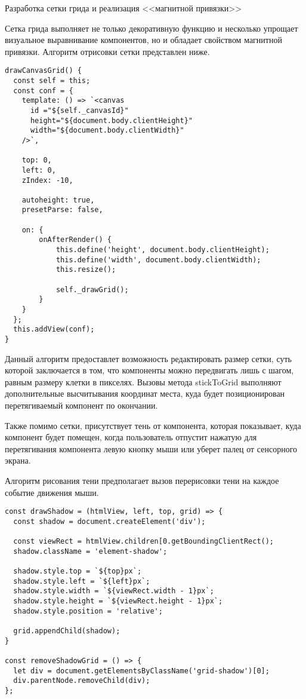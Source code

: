 \subsubsection{}Разработка сетки грида и реализация <<магнитной привязки>>
\

Сетка грида выполняет не только декоративную функцию и несколько упрощает визуальное выравнивание компонентов, но и обладает свойством магнитной привязки. Алгоритм отрисовки сетки представлен ниже.

\begin{lstlisting}
drawCanvasGrid() {
  const self = this;
  const conf = {
    template: () => `<canvas
      id ="${self._canvasId}"
      height="${document.body.clientHeight}"
      width="${document.body.clientWidth}"
    />`,

    top: 0,
    left: 0,
    zIndex: -10,

    autoheight: true,
    presetParse: false,
    
    on: {
        onAfterRender() {
            this.define('height', document.body.clientHeight);
            this.define('width', document.body.clientWidth);
            this.resize();

            self._drawGrid();
        }
    }
  };
  this.addView(conf);
}
\end{lstlisting}

Данный алгоритм предоставлет возможность редактировать размер сетки, суть которой заключается в том, что компоненты можно передвигать лишь с шагом, равным размеру клетки в пикселях. Вызовы метода stickToGrid выполняют дополнительные высчитывания координат места, куда будет позиционирован перетягиваемый компонент по окончании.

Также помимо сетки, присутствует тень от компонента, которая показывает, куда компонент будет помещен, когда пользователь отпустит нажатую для перетягивания компонента левую кнопку мыши или уберет палец от сенсорного экрана.

Алгоритм рисования тени предполагает вызов перерисовки тени на каждое событие движения мыши.

\begin{lstlisting}
const drawShadow = (htmlView, left, top, grid) => {
  const shadow = document.createElement('div');

  const viewRect = htmlView.children[0.getBoundingClientRect();
  shadow.className = 'element-shadow';

  shadow.style.top = `${top}px`;
  shadow.style.left = `${left}px`;
  shadow.style.width = `${viewRect.width - 1}px`;
  shadow.style.height = `${viewRect.height - 1}px`;
  shadow.style.position = 'relative';

  grid.appendChild(shadow);
}

const removeShadowGrid = () => {
  let div = document.getElementsByClassName('grid-shadow')[0];
  div.parentNode.removeChild(div);
};
\end{lstlisting}

